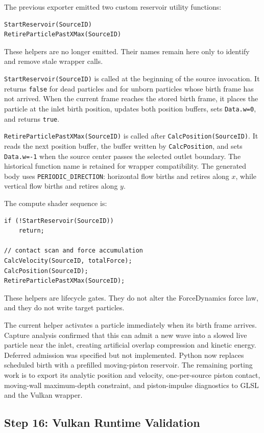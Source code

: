 The previous exporter emitted two custom reservoir utility functions:
\begin{verbatim}
StartReservoir(SourceID)
RetireParticlePastXMax(SourceID)
\end{verbatim}

These helpers are no longer emitted.  Their names remain here only to identify
and remove stale wrapper calls.

\texttt{StartReservoir(SourceID)} is called at the beginning of the source
invocation.  It returns \texttt{false} for dead particles and for unborn
particles whose birth frame has not arrived.  When the current frame reaches
the stored birth frame, it places the particle at the inlet birth position,
updates both position buffers, sets \texttt{Data.w=0}, and returns
\texttt{true}.

\texttt{RetireParticlePastXMax(SourceID)} is called after
\texttt{CalcPosition(SourceID)}.  It reads the next position buffer, the buffer
written by \texttt{CalcPosition}, and sets \texttt{Data.w=-1} when the source
center passes the selected outlet boundary.  The historical function name is
retained for wrapper compatibility.  The generated body uses
\texttt{PERIODIC\_DIRECTION}: horizontal flow births and retires along \(x\),
while vertical flow births and retires along \(y\).

The compute shader sequence is:
\begin{verbatim}
if (!StartReservoir(SourceID))
    return;

// contact scan and force accumulation
CalcVelocity(SourceID, totalForce);
CalcPosition(SourceID);
RetireParticlePastXMax(SourceID);
\end{verbatim}

These helpers are lifecycle gates.  They do not alter the ForceDynamics force
law, and they do not write target particles.

The current helper activates a particle immediately when its birth frame
arrives.  Capture analysis confirmed that this can admit a new wave into a
slowed live particle near the inlet, creating artificial overlap compression
and kinetic energy.  Deferred admission was specified but not implemented.
Python now replaces scheduled birth with a prefilled moving-piston reservoir.
The remaining porting work is to export its analytic position and velocity,
one-per-source piston contact, moving-wall maximum-depth constraint, and
piston-impulse diagnostics to GLSL and the Vulkan wrapper.

\subsection{Step 16: Vulkan Runtime Validation}

